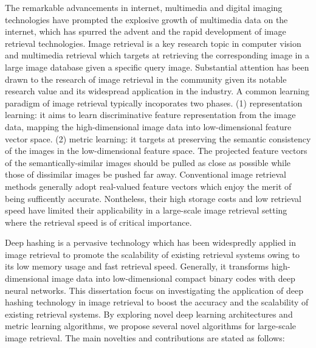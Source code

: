 \begin{abstract*}
The remarkable advancements in internet, multimedia  and digital imaging technologies have prompted the explosive growth of multimedia data on the internet, which has spurred the advent and the rapid development of image retrieval technologies. Image retrieval is a key research topic in computer vision and multimedia retrieval which targets at retrieving the corresponding image in a large image database given a specific query image. Substantial attention has been drawn to the research of image retrieval in the community given its notable research value and its widespread application in the industry. A common learning paradigm of image retrieval typically incoporates two phases. (1) representation learning: it aims to learn discriminative feature representation from the image data, mapping the high-dimensional image data into low-dimensional feature vector space.  (2) metric learning: it targets at preserving the semantic consistency of the images in the low-dimensional feature space. The projected feature vectors of the semantically-similar images should be pulled as close as possible while those of  dissimilar images be pushed far away. Conventional image retrieval methods generally adopt real-valued feature vectors which enjoy the merit of being sufficently accurate. Nontheless, their high storage costs and low retrieval speed have limited their applicability in a large-scale image retrieval setting where the retrieval speed is of critical importance. \par
Deep hashing is a pervasive technology which has been widespredly applied in image retrieval to promote the scalability of existing retrieval systems owing to its low memory usage and fast retrieval speed. Generally, it transforms high-dimensional image data into low-dimensional compact binary codes with deep neural networks. This dissertation focus on investigating the application of deep hashing technology in image retrieval to boost the accuracy and the scalability of existing retrieval systems.  By exploring novel deep learning architectures and metric learning algorithms, we propose several novel algorithms for large-scale image retrieval. The main novelties and contributions are stated as follows:
\begin{enumerate}

\end{enumerate}
\end{abstract*}
